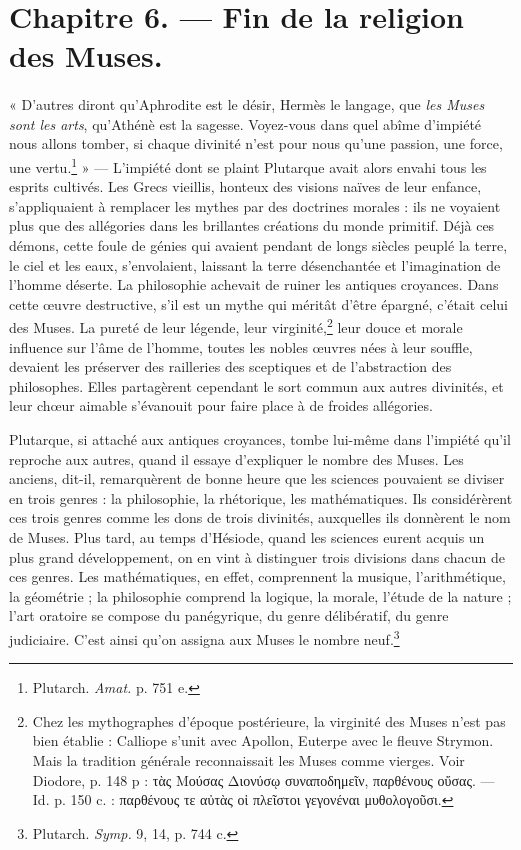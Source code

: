 \documentclass[a4paper, 11pt, oneside, polutonikogreek, french]{article}
\begin{document}
\section{Chapitre 6. --- Fin de la religion des Muses.}
\paragraph{}
« D'autres diront qu'Aphrodite est le désir, Hermès le langage, que \emph{les Muses sont les arts}, qu'Athénè est la sagesse. Voyez-vous dans quel abîme d'impiété nous allons tomber, si chaque divinité n'est pour nous qu'une passion, une force, une vertu.\footnote{Plutarch. \emph{Amat.} p. 751 e.} » --- L'impiété dont se plaint Plutarque avait alors envahi tous les esprits cultivés. Les Grecs vieillis, honteux des visions naïves de leur enfance, s'appliquaient à remplacer les mythes par des doctrines morales : ils ne voyaient plus que des allégories dans les brillantes créations du monde primitif. Déjà ces démons, cette foule de génies qui avaient pendant de longs siècles peuplé la terre, le ciel et les eaux, s'envolaient, laissant la terre désenchantée et l'imagination de l'homme déserte. La philosophie achevait de ruiner les antiques croyances. Dans cette œuvre destructive, s'il est un mythe qui méritât d'être épargné, c'était celui des Muses. La pureté de leur légende, leur virginité,\footnote{Chez les mythographes d'époque postérieure, la virginité des Muses n'est pas bien établie : Calliope s'unit avec Apollon, Euterpe avec le fleuve Strymon. Mais la tradition générale reconnaissait les Muses comme vierges. Voir Diodore, p. 148 p : τὰς Μούσας Διονύσῳ συναποδημεῖν, παρθένους οὔσας. --- Id. p. 150 c. : παρθένους τε αὐτὰς οἱ πλεῖστοι γεγονέναι μυθολογοῦσι.} leur douce et morale influence sur l'âme de l'homme, toutes les nobles œuvres nées à leur souffle, devaient les préserver des railleries des sceptiques et de l'abstraction des philosophes. Elles partagèrent cependant le sort commun aux autres divinités, et leur chœur aimable s'évanouit pour faire place à de froides allégories.

Plutarque, si attaché aux antiques croyances, tombe lui-même dans l'impiété qu'il reproche aux autres, quand il essaye d'expliquer le nombre des Muses. Les anciens, dit-il, remarquèrent de bonne heure que les sciences pouvaient se diviser en trois genres : la philosophie, la rhétorique, les mathématiques. Ils considérèrent ces trois genres comme les dons de trois divinités, auxquelles ils donnèrent le nom de Muses. Plus tard, au temps d'Hésiode, quand les sciences eurent acquis un plus grand développement, on en vint à distinguer trois divisions dans chacun de ces genres. Les mathématiques, en effet, comprennent la musique, l'arithmétique, la géométrie ; la philosophie comprend la logique, la morale, l'étude de la nature ; l'art oratoire se compose du panégyrique, du genre délibératif, du genre judiciaire. C'est ainsi qu'on assigna aux Muses le nombre neuf.\footnote{Plutarch. \emph{Symp.} 9, 14, p. 744 c.}
\end{document}

